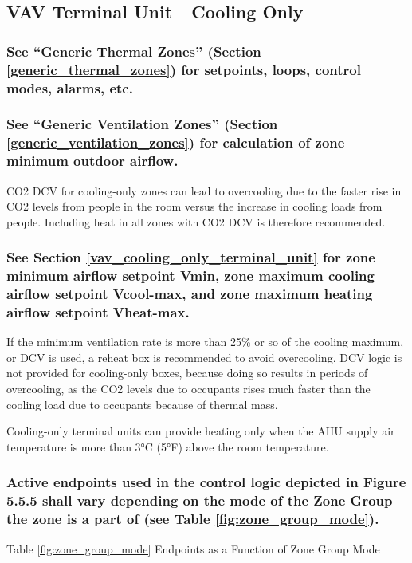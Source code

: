 \documentclass[letterpaper]{article}
\begin{document}
\addtocounter{subsection}{1}

\subsection{VAV Terminal Unit—Cooling Only}
\subsubsection{See “Generic Thermal Zones” (Section \ref{generic_thermal_zones}) for setpoints, loops, control modes, alarms, etc.}
\subsubsection{See “Generic Ventilation Zones” (Section \ref{generic_ventilation_zones}) for calculation of zone minimum outdoor airflow.}

CO2 DCV for cooling-only zones can lead to overcooling due to the faster rise in CO2 levels from people in the room versus the increase in cooling loads from people. Including heat in all zones with CO2 DCV is therefore recommended. 

\subsubsection{See Section \ref{vav_cooling_only_terminal_unit} for zone minimum airflow setpoint Vmin, zone maximum cooling airflow setpoint Vcool-max, and zone maximum heating airflow setpoint Vheat-max.}

If the minimum ventilation rate is more than 25\% or so of the cooling maximum, or DCV is used, a reheat box is recommended to avoid overcooling. DCV logic is not provided for cooling-only boxes, because doing so results in periods of overcooling, as the CO2 levels due to occupants rises much faster than the cooling load due to occupants because of thermal mass.

Cooling-only terminal units can provide heating only when the AHU supply air temperature is more than 3°C (5°F) above the room temperature.

\subsubsection{Active endpoints used in the control logic depicted in Figure 5.5.5 shall vary depending on the mode of the Zone Group the zone is a part of (see Table \ref{fig:zone_group_mode}).}

\begin{center}
Table \ref{fig:zone_group_mode} Endpoints as a Function of Zone Group Mode \label{fig:zone_group_mode}
\end{center}
\end{document}
